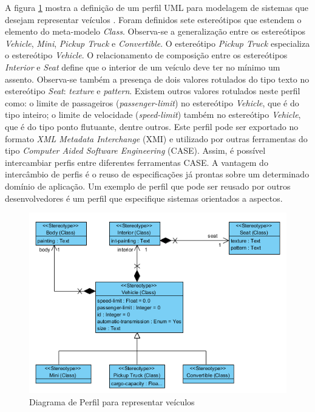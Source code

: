 A figura \ref{fig:profile_diagram} mostra a definição de um perfil UML para modelagem de sistemas que desejam representar veículos
\cite{VisualParadigm11}. Foram definidos sete estereótipos que estendem o elemento do meta-modelo \textit{Class}. Observa-se a generalização entre os
estereótipos \textit{Vehicle}, \textit{Mini}, \textit{Pickup Truck} e \textit{Convertible}. O estereótipo \textit{Pickup Truck} especializa o
estereótipo \textit{Vehicle}. O relacionamento de composição entre os estereótipos \textit{Interior} e \textit{Seat} define que o interior de um
veículo deve ter no mínimo um assento. Observa-se também a presença de dois valores rotulados do tipo texto no estereótipo \textit{Seat}:
\textit{texture} e \textit{pattern}. Existem outros valores rotulados neste perfil como: o limite de passageiros (\textit{passenger-limit}) no
estereótipo \textit{Vehicle}, que é do tipo inteiro; o limite de velocidade (\textit{speed-limit}) também no estereótipo \textit{Vehicle}, que é do
tipo ponto flutuante, dentre outros. Este perfil pode ser exportado no formato \textit{XML Metadata Interchange} (XMI) \cite{xmi:11} 
e utilizado por outras ferramentas do tipo \textit{Computer Aided Software Engineering} (CASE). Assim, 
é possível intercambiar perfis entre diferentes ferramentas CASE. A vantagem do intercâmbio de perfis é o reuso de
especificações já prontas sobre um determinado domínio de aplicação. Um exemplo de perfil que pode ser reusado por outros desenvolvedores é um perfil
que especifique sistemas orientados a aspectos.

\begin{figure}
	\centering
	\includegraphics{img/profile_diagram.png}
	\caption{Diagrama de Perfil para representar veículos}\label{fig:profile_diagram}
\end{figure}

